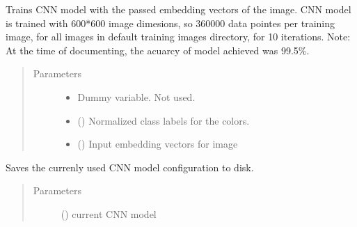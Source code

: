\documentclass[letterpaper,10pt,english]{sphinxmanual}
\begin{document}
\begin{fulllineitems}
\label{\detokenize{pyleaf.basefunctions:pyleaf.basefunctions.regular}}
Trains CNN model with the passed embedding vectors of the image.
CNN model is trained with 600*600 image dimesions, so 360000 data pointes per training image, for all images in default training images directory, for 10 iterations.
Note: At the time of documenting, the acuarcy of model achieved was 99.5\%.
\begin{quote}\begin{description}
\item[{Parameters}] \leavevmode\begin{itemize}
\item {} 
 \textendash{} Dummy variable. Not used.

\item {} 
 () \textendash{} Normalized class labels for the colors.

\item {} 
 () \textendash{} Input embedding vectors for image

\end{itemize}

\end{description}\end{quote}

\end{fulllineitems}


\begin{fulllineitems}
\label{\detokenize{pyleaf.basefunctions:pyleaf.basefunctions.saveModelToDisk}}
Saves the currenly used CNN model configuration to disk.
\begin{quote}\begin{description}
\item[{Parameters}] \leavevmode
{} () \textendash{} current CNN model

\end{description}\end{quote}

\end{fulllineitems}
\end{document}
